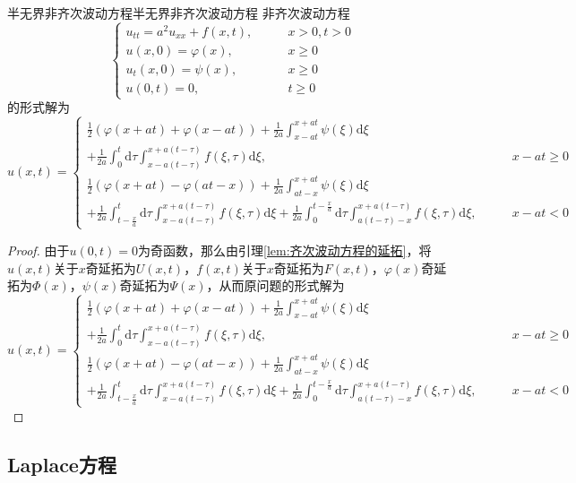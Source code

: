 \documentclass[lang = cn, scheme = chinese, thmcnt = section]{elegantbook}
\newcommand{\dd}{\mathrm{d}}           %
\newcommand{\dis}{\displaystyle}
\begin{document}
\begin{theorem}{半无界非齐次波动方程}{半无界非齐次波动方程}
	非齐次波动方程
	$$
	\begin{cases}
		u_{tt}=a^2u_{xx}+f(x,t),\qquad & x>0,t>0\\
		u(x,0)=\varphi(x),\qquad & x\ge 0\\
		u_t(x,0)=\psi(x),\qquad & x\ge 0\\
		u(0,t)=0,\qquad & t\ge 0
	\end{cases}
	$$
	的形式解为
	$$
	u(x,t)=\begin{cases}
		\dis
		\frac{1}{2}(\varphi(x+at)+\varphi(x-at))+\frac{1}{2a}\int_{x-at}^{x+at}\psi(\xi)\dd\xi\\
		\dis+\frac{1}{2a}\int_{0}^{t}\dd\tau\int_{x-a(t-\tau)}^{x+a(t-\tau)}f(\xi,\tau)\dd\xi
		,\qquad&  x-at\ge 0\\
		\dis
		\frac{1}{2}(\varphi(x+at)-\varphi(at-x))+\frac{1}{2a}\int_{at-x}^{x+at}\psi(\xi)\dd\xi\\\dis+\frac{1}{2a}\int_{t-\frac{x}{a}}^{t}\dd\tau\int_{x-a(t-\tau)}^{x+a(t-\tau)}f(\xi,\tau)\dd\xi+\frac{1}{2a}\int_{0}^{t-\frac{x}{a}}\dd\tau\int_{a(t-\tau)-x}^{x+a(t-\tau)}f(\xi,\tau)\dd\xi
		,\qquad & x-at< 0
	\end{cases}
	$$
\end{theorem}

\begin{proof}
	由于$u(0,t)=0$为奇函数，那么由引理\ref{lem:齐次波动方程的延拓}，将$u(x,t)$关于$x$奇延拓为$U(x,t)$，$f(x,t)$关于$x$奇延拓为$F(x,t)$，$\varphi(x)$奇延拓为$\Phi(x)$，$\psi(x)$奇延拓为$\Psi(x)$，从而原问题的形式解为
	$$
	u(x,t)=\begin{cases}
		\dis
		\frac{1}{2}(\varphi(x+at)+\varphi(x-at))+\frac{1}{2a}\int_{x-at}^{x+at}\psi(\xi)\dd\xi\\
		\dis+\frac{1}{2a}\int_{0}^{t}\dd\tau\int_{x-a(t-\tau)}^{x+a(t-\tau)}f(\xi,\tau)\dd\xi
		,\qquad&  x-at\ge 0\\
		\dis
		\frac{1}{2}(\varphi(x+at)-\varphi(at-x))+\frac{1}{2a}\int_{at-x}^{x+at}\psi(\xi)\dd\xi\\\dis+\frac{1}{2a}\int_{t-\frac{x}{a}}^{t}\dd\tau\int_{x-a(t-\tau)}^{x+a(t-\tau)}f(\xi,\tau)\dd\xi+\frac{1}{2a}\int_{0}^{t-\frac{x}{a}}\dd\tau\int_{a(t-\tau)-x}^{x+a(t-\tau)}f(\xi,\tau)\dd\xi
		,\qquad & x-at< 0
	\end{cases}
	$$
\end{proof}

\subsection{Laplace方程}
\end{document}
